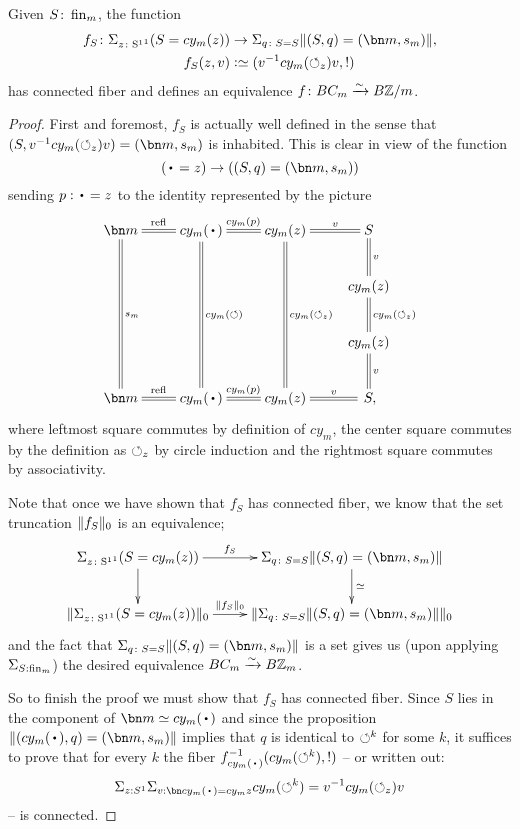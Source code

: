 \begin{example}
\begin{lemma}
  Given $S\colon\fin_m$, the function 
  \begin{align*}
    f_S\colon\Sigma_{z\colon\Sc^1}(S=cy_m(z))&\to \Sigma_{q\colon S=S}\Trunc{(S,q)=(\bn m,s_m)},\\
 f_S(z,v)&\defequi (v^{-1}cy_m(\Sloop_z)v,!)
  \end{align*}
  has connected fiber and defines 
 an equivalence $f\colon BC_m\xrightarrow{\sim} B\mathbb{Z}/m$.
\end{lemma}
\begin{proof}
  First and foremost, $f_S$ is actually well defined in the sense that $(S,v^{-1}cy_m(\Sloop_z)v)=(\bn m,s_m)$ is inhabited.
  This is clear in view of the function
  $$(\base =z)\to((S,q)=(\bn m,s_m))$$
  sending $p:\base= z$ to the identity represented by the picture
  $$\xymatrix{
    \bn m\ar@{=}[ddd]^{s_m}\ar@{=}[r]^-{\refl{} }& cy_m(\base)\ar@{=}[ddd]^{cy_m(\Sloop)}\ar@{=}[r]^{cy_m(p)}&cy_m(z)\ar@{=}[ddd]^{cy_m(\Sloop_z)}\ar@{=}[r]^-v&S\ar@{=}[d]^-v\\
    &&&cy_m(z)\ar@{=}[d]^{cy_m(\Sloop_z)}\\
     &&&cy_m(z)\ar@{=}[d]^-v\\
     \bn m\ar@{=}[r]^-{\refl{} }& cy_m(\base)\ar@{=}[r]^{cy_m(p)}&cy_m(z)\ar@{=}[r]^-v&\,S,}
  $$
  where leftmost square commutes by definition of $cy_m$, the center square commutes by the definition as $\circlearrowleft_z$ by circle induction and the rightmost square commutes by associativity.

  Note that  once we have shown that $f_S$ has connected fiber, we know that the set truncation $\lVert f_S\rVert_0$ is an equivalence;
  $$\xymatrix{\Sigma_{z\colon\Sc^1}(S=cy_m(z))\ar[r]^-{f_S}\ar[d]& \Sigma_{q\colon S=S}\Trunc{(S,q)=(\bn m,s_m)}\ar[d]^{\simeq}\\
 \Trunc{\Sigma_{z\colon\Sc^1}(S=cy_m(z))}_0\ar[r]^-{\Trunc{f_S}_0}& \Trunc{\Sigma_{q\colon S=S}\Trunc{(S,q)=(\bn m,s_m)}}_0 }
  $$ and the fact that $\Sigma_{q\colon S=S}\Trunc{(S,q)=(\bn m,s_m)}$ is a set gives us (upon applying $\Sigma_{S:\fin_m}$) the desired equivalence $BC_m\xrightarrow{\sim} B\mathbb{Z}_m$.

  So to finish the proof we must show that $f_S$ has connected fiber.
  Since $S$ lies in the component of $\bn m\oldequiv cy_m(\base)$ and since the proposition $\Trunc{(cy_m(\base),q)=(\bn m,s_m)}$ implies that $q$ is identical to $\circlearrowleft^k$ for some $k$, it suffices to prove that for every $k$ the fiber
  $f_{cy_m(\base)}^{-1}(cy_m(\Sloop^k),!)$ -- or written out:
  $$\Sigma_{z:S^1}\Sigma_{v:\bn cy_m(\base)=cy_m z}cy_m(\Sloop^k)=v^{-1}cy_m(\Sloop_z)v$$
   -- is connected.


\end{proof}
\end{example}
